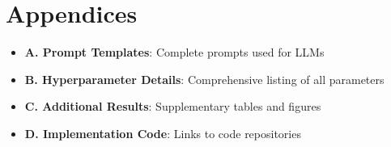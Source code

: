 \documentclass[a4paper,12pt]{extarticle}
\begin{document}
\printbibliography

\section*{Appendices}
\begin{itemize}
\item \textbf{A. Prompt Templates}: Complete prompts used for LLMs
\item \textbf{B. Hyperparameter Details}: Comprehensive listing of all parameters
\item \textbf{C. Additional Results}: Supplementary tables and figures
\item \textbf{D. Implementation Code}: Links to code repositories
\end{itemize}
\end{document}
